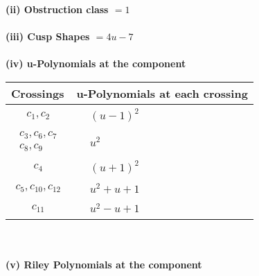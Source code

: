 \documentclass[1p]{elsarticle_modified}
\theoremstyle{definition}
\begin{document}
\flushleft \textbf{(ii) Obstruction class $= 1$}\\~\\
\flushleft \textbf{(iii) Cusp Shapes $= 4 u-7$}\\~\\
\newpage\renewcommand{\arraystretch}{1}
\flushleft \textbf{(iv) u-Polynomials at the component}\newline \\
\begin{tabular}{m{50pt}|m{274pt}}
Crossings & \hspace{64pt}u-Polynomials at each crossing \\
\hline $$\begin{aligned}c_{1},c_{2}\end{aligned}$$&$\begin{aligned}
&(u-1)^2
\end{aligned}$\\
\hline $$\begin{aligned}c_{3},c_{6},c_{7}\\c_{8},c_{9}\end{aligned}$$&$\begin{aligned}
&u^2
\end{aligned}$\\
\hline $$\begin{aligned}c_{4}\end{aligned}$$&$\begin{aligned}
&(u+1)^2
\end{aligned}$\\
\hline $$\begin{aligned}c_{5},c_{10},c_{12}\end{aligned}$$&$\begin{aligned}
&u^2+u+1
\end{aligned}$\\
\hline $$\begin{aligned}c_{11}\end{aligned}$$&$\begin{aligned}
&u^2- u+1
\end{aligned}$\\
\hline
\end{tabular}\\~\\
\newpage\renewcommand{\arraystretch}{1}
\flushleft \textbf{(v) Riley Polynomials at the component}\newline \\
\end{document}
